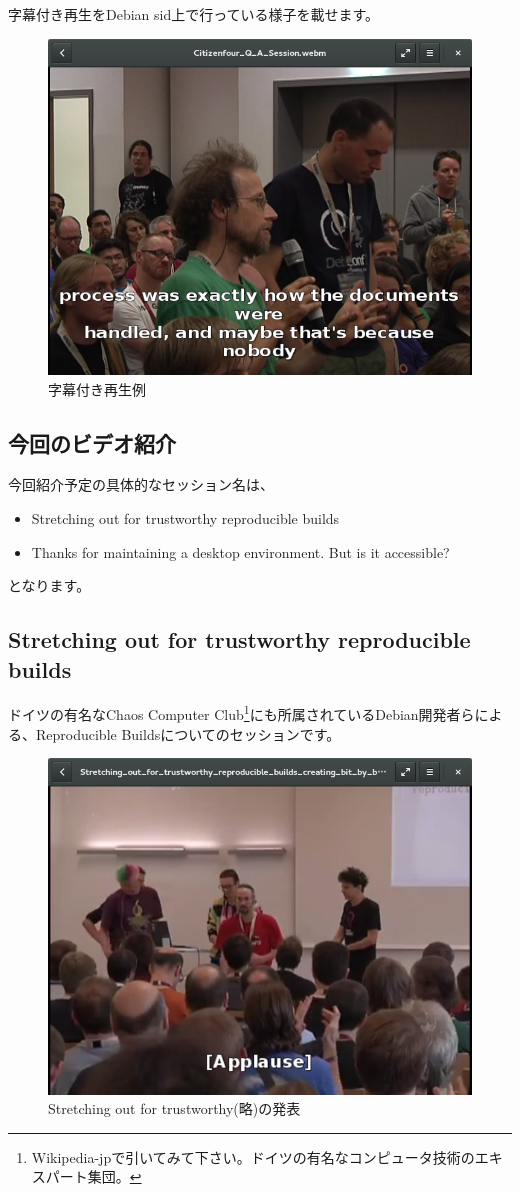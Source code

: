 \documentclass[mingoth,a4paper]{jsarticle}
\begin{document}
 字幕付き再生をDebian sid上で行っている様子を載せます。
  
\begin{figure}[H]
\begin{center}
\includegraphics[width=0.5\hsize]{image201510/subtitle.png}
\end{center}
\caption{字幕付き再生例}
\end{figure}

\subsection{今回のビデオ紹介}

 今回紹介予定の具体的なセッション名は、

\begin{itemize}
\item Stretching out for trustworthy reproducible builds
\item Thanks for maintaining a desktop environment. But is it accessible?
\end{itemize}

となります。

\subsection{Stretching out for trustworthy reproducible builds}

 ドイツの有名なChaos Computer Club\footnote{Wikipedia-jpで引いてみて下さい。ドイツの有名なコンピュータ技術のエキスパート集団。}にも所属されているDebian開発者らによる、Reproducible Buildsについてのセッションです。

\begin{figure}[H]
\begin{center}
\includegraphics[width=0.5\hsize]{image201510/reproduct.png}
\end{center}
\caption{Stretching out for trustworthy(略)の発表}
\end{figure}
\end{document}
